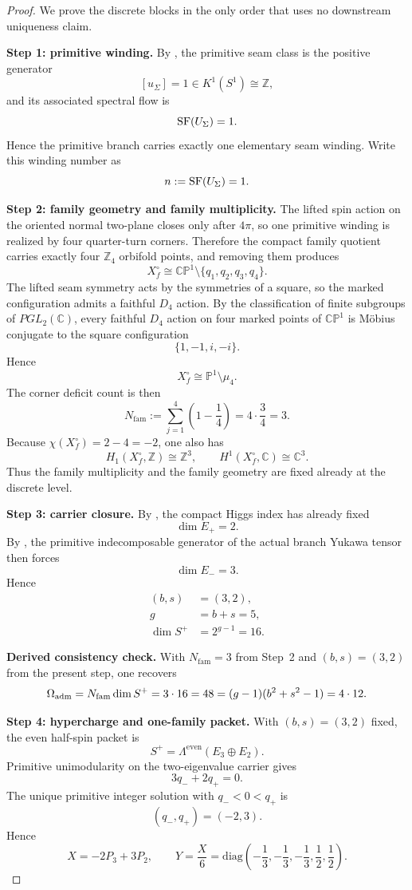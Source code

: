 \begin{proof}
We prove the discrete blocks in the only order that uses no downstream uniqueness claim.

\textbf{Step 1: primitive winding.}
By , the primitive seam class is the positive generator
\[
[u_\Sigma]=1\in K^1(S^1)\cong\mathbb Z,
\]
and its associated spectral flow is
\[
\operatorname{SF}(U_\Sigma)=1.
\]
Hence the primitive branch carries exactly one elementary seam winding. Write this winding number as
\[
n:=\operatorname{SF}(U_\Sigma)=1.
\]

\textbf{Step 2: family geometry and family multiplicity.}
The lifted spin action on the oriented normal two-plane closes only after $4\pi$, so one primitive
winding is realized by four quarter-turn corners. Therefore the compact family quotient carries
exactly four $\mathbb Z_4$ orbifold points, and removing them produces
\[
X_f^\circ\cong\mathbb{CP}^1\setminus\{q_1,q_2,q_3,q_4\}.
\]
The lifted seam symmetry acts by the symmetries of a square, so the marked configuration admits a
faithful $D_4$ action. By the classification of finite subgroups of $PGL_2(\mathbb C)$, every
faithful $D_4$ action on four marked points of $\mathbb{CP}^1$ is M\"obius conjugate to the square
configuration
\[
\{1,-1,i,-i\}.
\]
Hence
\[
X_f^\circ\cong\mathbb P^1\setminus\mu_4.
\]
The corner deficit count is then
\[
N_{\mathrm{fam}}
:=
\sum_{j=1}^{4}\left(1-\frac14\right)
=
4\cdot\frac34
=
3.
\]
Because $\chi(X_f^\circ)=2-4=-2$, one also has
\[
H_1(X_f^\circ,\mathbb Z)\cong\mathbb Z^3,
\qquad
H^1(X_f^\circ,\mathbb C)\cong\mathbb C^3.
\]
Thus the family multiplicity and the family geometry are fixed already at the discrete level.

\textbf{Step 3: carrier closure.}
By , the compact Higgs index has already fixed
\[
\dim E_+=2.
\]
By , the primitive indecomposable generator of the actual branch Yukawa tensor
then forces
\[
\dim E_-=3.
\]
Hence
\[
\begin{aligned}
(b,s)&=(3,2),\\
g&=b+s=5,\\
\dim S^+&=2^{g-1}=16.
\end{aligned}
\]

\textbf{Derived consistency check.}
With $N_{\mathrm{fam}}=3$ from Step~2 and $(b,s)=(3,2)$ from the present step, one recovers
\[
\Omega_{\mathrm{adm}}
=
N_{\mathrm{fam}}\dim S^+
=
3\cdot 16
=
48
=
(g-1)(b^2+s^2-1)
=
4\cdot 12.
\]

\textbf{Step 4: hypercharge and one-family packet.}
With $(b,s)=(3,2)$ fixed, the even half-spin packet is
\[
S^+=\Lambda^{\mathrm{even}}(E_3\oplus E_2).
\]
Primitive unimodularity on the two-eigenvalue carrier gives
\[
3q_-+2q_+=0.
\]
The unique primitive integer solution with $q_-<0<q_+$ is
\[
(q_-,q_+)=(-2,3).
\]
Hence
\[
X=-2P_3+3P_2,
\qquad
Y=\frac{X}{6}
=
\mathrm{diag}\!\left(-\frac13,-\frac13,-\frac13,\frac12,\frac12\right).
\]


\end{proof}

